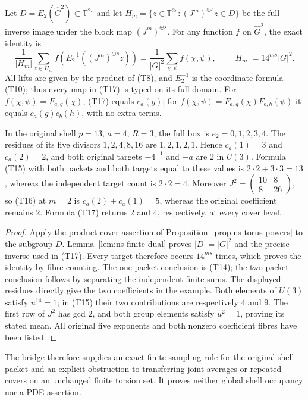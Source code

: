 \begin{corollary}
\label{cor:ns-es-cover-repair}
Let $D=E_2(\widehat G^2)\subset\mathbb T^{2s}$ and let
$H_m=\{z\in\mathbb T^{2s}:(J^m)^{\oplus s}z\in D\}$ be
the full inverse image under the block map $(J^m)^{\oplus s}$. For any function $f$ on
$\widehat G^2$, the exact identity is
\[
 \frac1{|H_m|}\sum_{z\in H_m}
   f\!\left(E_2^{-1}((J^m)^{\oplus s}z)\right)
   =\frac1{|G|^2}\sum_{\chi,\psi}f(\chi,\psi),
 \qquad |H_m|=14^{ms}|G|^2.                           \tag{T17}
\]
All lifts are given by the product of (T8), and $E_2^{-1}$ is
the coordinate formula (T10); thus every map in (T17) is typed
on its full domain. For $f(\chi,\psi)=F_{a,g}(\chi)$,
(T17) equals $c_a(g)$; for
$f(\chi,\psi)=F_{a,g}(\chi)F_{b,h}(\psi)$ it equals
$c_a(g)c_b(h)$, with no extra terms.

In the original shell $p=13$, $a=4$, $R=3$, the full box is
$e_2=0,1,2,3,4$. The residues of its five divisors
$1,2,4,8,16$ are $1,2,1,2,1$. Hence $c_a(1)=3$ and
$c_a(2)=2$, and both original targets $-4^{-1}$ and $-a$ are
$2$ in $U(3)$. Formula (T15) with both packets and both targets
equal to these values is $2\cdot2+3\cdot3=13$, whereas
the independent target count is $2\cdot2=4$.
Moreover
$J^2=\left(\begin{smallmatrix}10&8\\8&26\end{smallmatrix}\right)$,
so (T16) at $m=2$ is $c_a(2)+c_a(1)=5$, whereas the
original coefficient remains $2$. Formula (T17) returns $2$
and $4$, respectively, at every cover level.
\end{corollary}
\begin{proof}
Apply the product-cover assertion of Proposition~\ref{prop:ns-torus-powers}
to the subgroup $D$. Lemma~\ref{lem:ns-finite-dual} proves
$|D|=|G|^2$ and the precise inverse used in (T17). Every target
therefore occurs $14^{ms}$ times, which proves the identity by
fibre counting. The one-packet conclusion is (T14); the two-packet
conclusion follows by separating the independent finite sums.
The displayed residues directly give the two coefficients in
the example. Both elements of $U(3)$ satisfy $u^{14}=1$;
in (T15) their two contributions are respectively $4$ and $9$.
The first row of $J^2$ has gcd $2$, and both group elements
satisfy $u^2=1$, proving its stated mean. All original five
exponents and both nonzero coefficient fibres have been listed.
\end{proof}

The bridge therefore supplies an exact finite sampling rule for the
original shell packet and an explicit obstruction to transferring
joint averages or repeated covers on an unchanged finite torsion set.
It proves neither global shell occupancy nor a PDE assertion.
